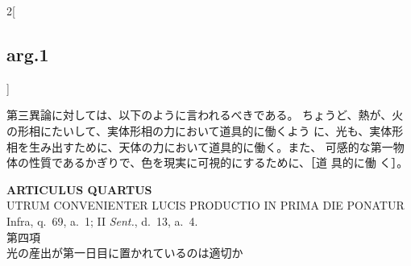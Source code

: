 \documentclass[paper=a4paper,fontsize=10pt,jafontsize=9pt,titlepage]{jlreq}
\begin{document}
\begin{paracol}{2}[\subsection{arg.1}]
\switchcolumn

第三異論に対しては、以下のように言われるべきである。
ちょうど、熱が、火の形相にたいして、実体形相の力において道具的に働くよう
 に、光も、実体形相を生み出すために、天体の力において道具的に働く。また、
 可感的な第一物体の性質であるかぎりで、色を現実に可視的にするために、［道
 具的に働
 く］。

\end{paracol}
\newpage
{}
{}
\setcounter{section}{4}
\setcounter{subsection}{0}






\begin{center}
 {\Large {\bfseries ARTICULUS QUARTUS}}\\
 {\large UTRUM CONVENIENTER LUCIS PRODUCTIO IN PRIMA DIE PONATUR}\\
 {\footnotesize Infra, q.~69, a.~1; II {\itshape Sent.}, d.~13, a.~4.}\\
 {\Large 第四項\\光の産出が第一日目に置かれているのは適切か}
\end{center}
\end{document}
